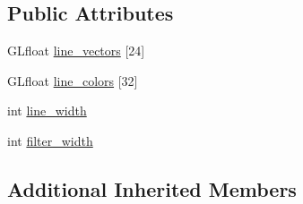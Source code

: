 \subsection*{Public Attributes}
\begin{DoxyCompactItemize}
\item 
G\-Lfloat \hyperlink{class_d_k_line_a3fe22b4bd7ffbaf5090742af7d3f8553}{line\-\_\-vectors} \mbox{[}24\mbox{]}
\item 
G\-Lfloat \hyperlink{class_d_k_line_a18739acc6f065789ac172adca4759fba}{line\-\_\-colors} \mbox{[}32\mbox{]}
\item 
int \hyperlink{class_d_k_line_a2827768b39671cc43eed90ede651a3fe}{line\-\_\-width}
\item 
int \hyperlink{class_d_k_line_a1ffad8a5f25754478fd53010a87ee9a1}{filter\-\_\-width}
\end{DoxyCompactItemize}
\subsection*{Additional Inherited Members}


